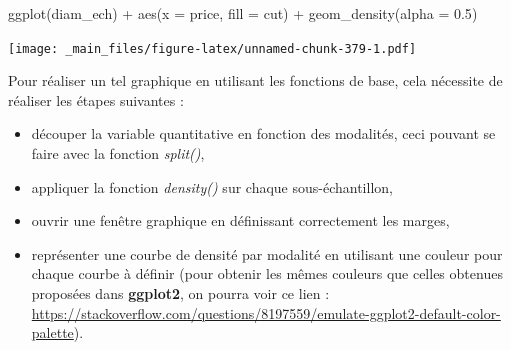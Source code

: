 \documentclass[
]{book}
\newenvironment{Shaded}{\begin{snugshade}}{\end{snugshade}}
\newcommand{\AttributeTok}[1]{\textcolor[rgb]{0.77,0.63,0.00}{#1}}
\newcommand{\FloatTok}[1]{\textcolor[rgb]{0.00,0.00,0.81}{#1}}
\newcommand{\FunctionTok}[1]{\textcolor[rgb]{0.00,0.00,0.00}{#1}}
\newcommand{\NormalTok}[1]{#1}
\newcommand{\SpecialCharTok}[1]{\textcolor[rgb]{0.00,0.00,0.00}{#1}}
\theoremstyle{definition}
\theoremstyle{definition}
\theoremstyle{definition}
\theoremstyle{definition}
\theoremstyle{remark}
\begin{document}
\begin{Shaded}
\begin{Highlighting}[]
\FunctionTok{ggplot}\NormalTok{(diam\_ech) }\SpecialCharTok{+} 
  \FunctionTok{aes}\NormalTok{(}\AttributeTok{x =}\NormalTok{ price, }\AttributeTok{fill =}\NormalTok{ cut) }\SpecialCharTok{+} 
  \FunctionTok{geom\_density}\NormalTok{(}\AttributeTok{alpha =} \FloatTok{0.5}\NormalTok{)}
\end{Highlighting}
\end{Shaded}

\texttt{[image: \_main\_files/figure-latex/unnamed-chunk-379-1.pdf]}

Pour réaliser un tel graphique en utilisant les fonctions de base, cela nécessite de réaliser les étapes suivantes :

\begin{itemize}
\item
  découper la variable quantitative en fonction des modalités, ceci pouvant se faire avec la fonction \emph{split()},
\item
  appliquer la fonction \emph{density()} sur chaque sous-échantillon,
\item
  ouvrir une fenêtre graphique en définissant correctement les marges,
\item
  représenter une courbe de densité par modalité en utilisant une couleur pour chaque courbe à définir (pour obtenir les mêmes couleurs que celles obtenues proposées dans \textbf{ggplot2}, on pourra voir ce lien : \url{https://stackoverflow.com/questions/8197559/emulate-ggplot2-default-color-palette}).
\end{itemize}
\end{document}
